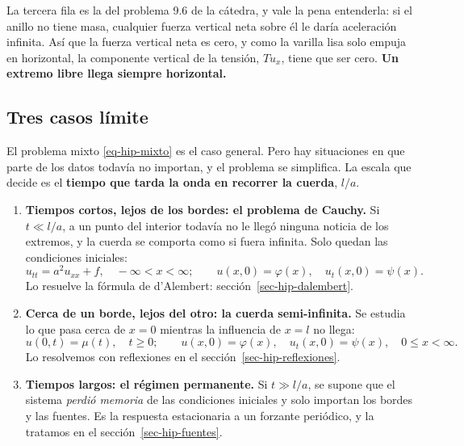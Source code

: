 \documentclass[
  spanish,
  a4paper,
]{scrbook}
\providecommand{\tightlist}{%
  \setlength{\itemsep}{0pt}\setlength{\parskip}{0pt}}
\theoremstyle{definition}
\theoremstyle{plain}
\theoremstyle{definition}
\theoremstyle{plain}
\theoremstyle{definition}
\theoremstyle{remark}
\begin{document}
La tercera fila es la del problema 9.6 de la cátedra, y vale la pena
entenderla: si el anillo no tiene masa, cualquier fuerza vertical neta
sobre él le daría aceleración infinita. Así que la fuerza vertical neta
es cero, y como la varilla lisa solo empuja en horizontal, la componente
vertical de la tensión, \(T u_x\), tiene que ser cero. \textbf{Un
extremo libre llega siempre horizontal.}

\subsection{Tres casos límite}\label{sec-hip-casos-limite}

El problema mixto \ref{eq-hip-mixto} es el caso general. Pero hay
situaciones en que parte de los datos todavía no importan, y el problema
se simplifica. La escala que decide es el \textbf{tiempo que tarda la
onda en recorrer la cuerda}, \(l/a\).

\begin{enumerate}
\def\labelenumi{\arabic{enumi}.}
\tightlist
\item
  \textbf{Tiempos cortos, lejos de los bordes: el problema de Cauchy.}
  Si \(t \ll l/a\), a un punto del interior todavía no le llegó ninguna
  noticia de los extremos, y la cuerda se comporta como si fuera
  infinita. Solo quedan las condiciones iniciales:
  \[u_{tt} = a^2u_{xx} + f,\quad -\infty<x<\infty;\qquad u(x,0)=\varphi(x),\quad u_t(x,0)=\psi(x).\]
  Lo resuelve la fórmula de d'Alembert: sección~\ref{sec-hip-dalembert}.
\item
  \textbf{Cerca de un borde, lejos del otro: la cuerda semi-infinita.}
  Se estudia lo que pasa cerca de \(x=0\) mientras la influencia de
  \(x=l\) no llega:
  \[u(0,t) = \mu(t),\quad t\ge0;\qquad u(x,0)=\varphi(x),\quad u_t(x,0)=\psi(x),\quad 0\le x<\infty .\]
  Lo resolvemos con reflexiones en el sección~\ref{sec-hip-reflexiones}.
\item
  \textbf{Tiempos largos: el régimen permanente.} Si \(t\gg l/a\), se
  supone que el sistema \emph{perdió memoria} de las condiciones
  iniciales y solo importan los bordes y las fuentes. Es la respuesta
  estacionaria a un forzante periódico, y la tratamos en el
  sección~\ref{sec-hip-fuentes}.
\end{enumerate}
\end{document}
